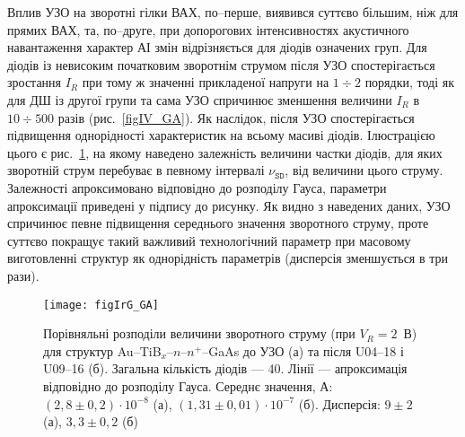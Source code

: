 Вплив УЗО на зворотні гілки ВАХ, по--перше, виявився суттєво більшим, ніж для прямих ВАХ, та, по--друге,
при допорогових інтенсивностях акустичного навантаження характер АІ змін відрізняється для діодів означених груп.
Для діодів із невисоким початковим зворотнім струмом після УЗО спостерігається зростання $I_R$ при тому ж значенні прикладеної напруги на $1\div2$ порядки,
тоді як для ДШ із другої групи та сама УЗО спричинює зменшення величини $I_R$ в $10\div500$ разів (рис.~\ref{figIV_GA}).
Як наслідок, після УЗО спостерігається підвищення однорідності характеристик на всьому масиві діодів.
Ілюстрацією цього є рис.~\ref{figIrG_GA}, на якому наведено залежність величини частки діодів, для яких зворотній струм перебуває в певному інтервалі $\nu_\mathtt{SD}$,
від величини цього струму.
Залежності апроксимовано відповідно до розподілу Гауса, параметри апроксимації приведені у підпису до рисунку.
Як видно з наведених даних, УЗО спричинює певне підвищення середнього значення зворотного струму, проте суттєво
покращує такий важливий технологічний параметр при масовому виготовленні структур як однорідність параметрів (дисперсія зменшується в три рази).

\begin{figure}
\center
\texttt{[image: figIrG\_GA]}%
\caption{\label{figIrG_GA}
Порівняльні розподіли величини зворотного струму (при $V_R=2$~В)
для структур Au--TiB$_x$--$n$--$n^+$--GaAs до УЗО (а) та після U04--18 і U09--16 (б).
Загальна кількість діодів --- 40.
Лінії --- апроксимація відповідно до розподілу Гауса.
Середнє значення, А:
$(2,8\pm0,2)\cdot10^{-8}$ (а),
$(1,31\pm0,01)\cdot10^{-7}$ (б).
Дисперсія:
$9\pm2$ (а),
$3,3\pm0,2$ (б)
}
\end{figure}


